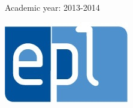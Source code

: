 \begin{titlepage}
\begin{center}
\begin{minipage}{0.25\textwidth}
\end{minipage}
\begin{minipage}{0.48\textwidth}
\begin{center}
\Large{Academic year: 2013-2014}
\end{center}
\end{minipage}
\begin{minipage}{0.25\textwidth}
\begin{flushright}
\includegraphics[scale=0.5]{Couverture/epl-logo.jpg}
\end{flushright}
\end{minipage}
\end{center}
\end{titlepage}
\newpage
